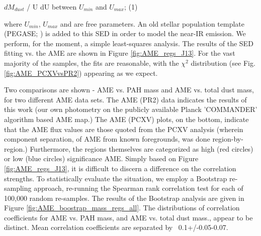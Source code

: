\documentclass[preprint2,longabstract]{aastex}
\begin{document}
     $dM_{dust}$ / U dU between $U_{min}$ and $U_{max}$; (1)

where $U_{min}$, $U_{max}$ and  are free parameters. An old stellar population template (PEGASE; \citep{fioc97}) is added to this SED in order to model the near-IR emission. We perform, for the moment, a simple least-squares analysis. The results of the SED fitting vs. the AME are shown in Figure \ref{fig:AME_regs_J13}. For the vast majority of the samples, the fits are reasonable, with the $\chi^{2}$ distribution (see Fig. \ref{fig:AME_PCXVvsPR2}) appearing as we expect.

     Two comparisons are shown - AME vs. PAH mass and AME vs. total dust mass, for two different AME data sets. The AME (PR2) data indicates the results of this work (our own photometry on the publicly available Planck 'COMMANDER' algorithm based AME map.) The AME (PCXV) plots, on the bottom, indicate that the AME flux values are those quoted from the PCXV analysis (wherein component separation, of AME from known foregrounds, was done region-by-region.) Furthermore, the regions themselves are categorized as high (red circles) or low (blue circles) significance AME. Simply based on Figure \ref{fig:AME_regs_J13}, it is difficult to discern a difference on the correlation strengths. To statistically evaluate the situation, we employ a Bootstrap re-sampling approach, re-running the Spearman rank correlation test for each of 100,000 random re-samples. The results of the Bootstrap analysis are given in Figure \ref{fig:AME_boostrap_mass_regs_all}. The distributions of correlation coefficients for AME vs. PAH mass, and AME vs. total dust mass., appear to be distinct. Mean correlation coefficients are separated by ~0.1+/-0.05-0.07.

\end{document}
